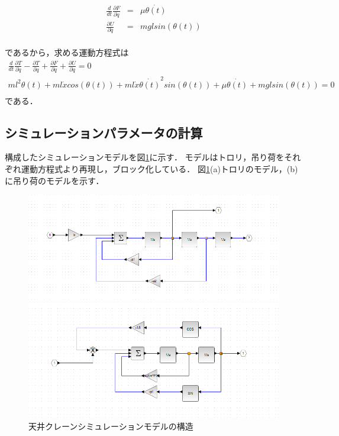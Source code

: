 \documentclass[dvipdfmx,titlepage,a4j]{jsarticle}  %
\begin{document}
\begin{eqnarray}
  \frac{d}{dt} \frac{\partial F}{\partial \dot{q}} &=&  \mu \dot{\theta(t)} \nonumber \\
  \frac{\partial U}{\partial \dot{q}} &=&  mgl sin(\theta(t)) \nonumber \\
\end{eqnarray}

であるから，求める運動方程式は
\begin{eqnarray}
  \frac{d}{dt} \frac{\partial T}{\partial \dot{q}} - \frac{\partial T}{\partial q} + \frac{\partial F}{\partial \dot q} + \frac{\partial U}{\partial \dot q} = 0 \nonumber \\
  m l^2 \theta(t) + m l \dot x cos(\theta(t)) + m l \dot x \dot{\theta(t)}^2 sin(\theta(t)) + \mu \dot{\theta(t)} + mgl sin(\theta(t)) = 0 \nonumber \\
\end{eqnarray}
である．

\subsection{シミュレーションパラメータの計算}
構成したシミュレーションモデルを図\ref{fig:crane:model2}に示す．
モデルはトロリ，吊り荷をそれぞれ運動方程式より再現し，ブロック化している．
図\ref{fig:crane:model2}(a)トロリのモデル，(b)に吊り荷のモデルを示す．

\begin{figure}[H]
  \begin{minipage}{6cm}
    \centering
    \includegraphics[keepaspectratio, scale=0.3]{../graph/ex-model-3.png}
  \end{minipage}
  \hfill
  \begin{minipage}{6cm}
    \centering
    \includegraphics[keepaspectratio, scale=0.3]{../graph/ex-model-4.png}
  \end{minipage}
  \caption{天井クレーンシミュレーションモデルの構造}
  \label{fig:crane:model2}
\end{figure}
\end{document}
